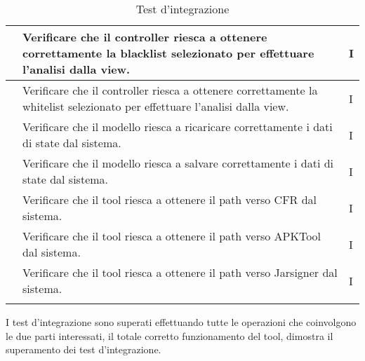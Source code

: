 \begin{center}
\begin{longtable}{ |C{3cm} | C{8.5cm}| C{1.5cm} |}
         &Verificare che il controller riesca a ottenere correttamente la blacklist selezionato per effettuare l'analisi dalla view.& I \\\hline
         &Verificare che il controller riesca a ottenere correttamente la whitelist selezionato per effettuare l'analisi dalla view.& I \\\hline
         &Verificare che il modello riesca a ricaricare correttamente i dati di state dal sistema.& I \\\hline
         &Verificare che il modello riesca a salvare correttamente i dati di state dal sistema.& I \\\hline
         &Verificare che il tool riesca a ottenere il path verso CFR dal sistema.& I \\\hline
         &Verificare che il tool riesca a ottenere il path verso APKTool dal sistema.& I \\\hline
         &Verificare che il tool riesca a ottenere il path verso Jarsigner dal sistema.& I \\\hline
        \caption{Test d'integrazione}
    \end{longtable}
\end{center}
I test d'integrazione sono superati effettuando tutte le operazioni che coinvolgono le due parti interessati, il totale corretto funzionamento del tool, dimostra il superamento dei test d'integrazione.
\setcounter{rowcount}{0}

